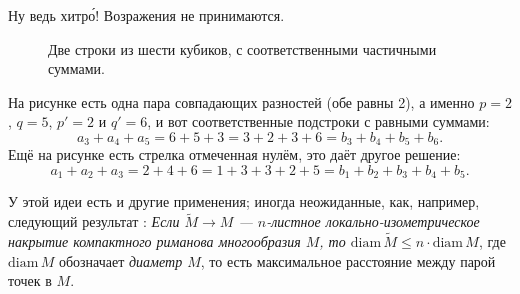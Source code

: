 Ну ведь хитр\'{о}!
Возражения не принимаются.

\begin{figure}[ht!]
\centering
{}
\caption{Две строки из шести кубиков, с соответственными частичными суммами.}
\label{pic:kubiki}
\end{figure}

На рисунке есть одна пара совпадающих разностей (обе равны 2), а именно $p=2$, $q=5$, $p'=2$ и $q'=6$, и
вот соответственные подстроки с равными суммами:
\[a_3+a_4+a_5=6+5+3=3+2+3+6=b_3+b_4+b_5+b_6.\]
Ещё на рисунке есть стрелка отмеченная нулём, это даёт другое решение:
\[a_1+a_2+a_3=2+4+6=1+3+3+2+5=b_1+b_2+b_3+b_4+b_5.\]

\begin{addedbytheeditors}
У этой идеи есть и другие применения; иногда неожиданные, как, например, следующий результат \cite{petrunin}:
\textit{Если $\tilde M\to M$ --- $n$-листное локально-изометрическое накрытие компактного риманова многообразия $M$, то $\mathrm{diam}\, \tilde M\le n\cdot \mathrm{diam}\, M$}, где $\mathrm{diam}\, M$ обозначает \textit{диаметр $M$}, то есть максимальное расстояние между парой точек в $M$.\pr
\end{addedbytheeditors}



